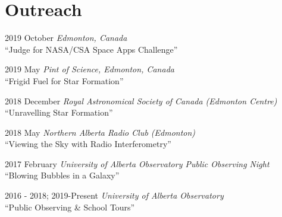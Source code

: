 \documentclass[letterpaper,11pt]{article}
\newlength{\mainindent} \setlength{\mainindent}{12pt}
\newlength{\contentindent} \setlength{\contentindent}{19ex}
\newenvironment{datelist}{
  \begingroup
  \raggedright
  \begin{description}[labelindent=\mainindent,leftmargin=\contentindent,
      style=sameline,font=\normalfont,topsep=0pt,partopsep=0pt,parsep=0pt,
      itemsep=4pt]
}{
  \end{description}
  \endgroup
}
\begin{document}
\section*{Outreach}
\begin{datelist}
\item[2019 October] \emph{Edmonton, Canada} \\ ``Judge for NASA/CSA Space Apps Challenge''
\item[2019 May] \emph{Pint of Science, Edmonton, Canada} \\ ``Frigid Fuel for Star Formation''
\item[2018 December] \emph{Royal Astronomical Society of Canada (Edmonton Centre)} \\ ``Unravelling Star Formation''
\item[2018 May] \emph{Northern Alberta Radio Club (Edmonton)} \\ ``Viewing the Sky with Radio Interferometry''
\item[2017 February] \emph{University of Alberta Observatory Public Observing Night} \\ ``Blowing Bubbles in a Galaxy''
\item[2016 - 2018; 2019-Present] \emph{University of Alberta Observatory} \\ ``Public Observing \& School Tours''
\end{datelist}
\end{document}
